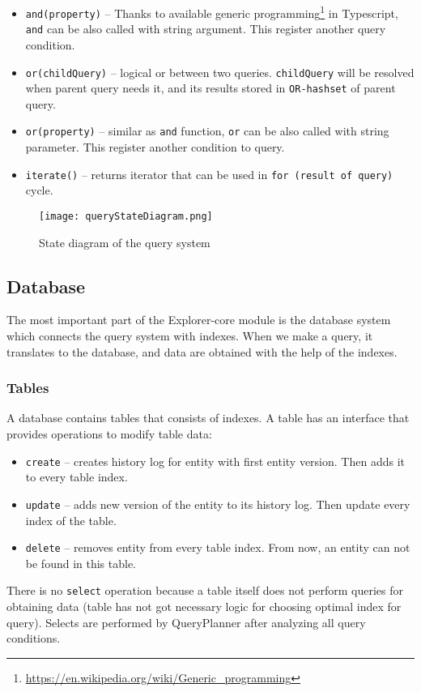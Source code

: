 \begin{itemize}
    \item \texttt{and(property)} -- Thanks to available generic programming\footnote{\url{https://en.wikipedia.org/wiki/Generic_programming}} in Typescript, \texttt{and} can be also called with string argument. This register another query condition.
    \item \texttt{or(childQuery)} -- logical or between two queries. \texttt{childQuery} will be resolved when parent query needs it, and its results stored in \texttt{OR-hashset} of parent query. 
    \item \texttt{or(property)} -- similar as \texttt{and} function, \texttt{or} can be also called with string parameter. This register another condition to query.
    \item \texttt{iterate()} -- returns iterator that can be used in \texttt{for (result of query)} cycle.
\end{itemize}


\begin{figure}[h]
    \centering
    \texttt{[image: queryStateDiagram.png]}
    \caption{State diagram of the query system}
    \label{queryStateDiagram}
\end{figure}


\subsection{Database}
The most important part of the Explorer-core module is the database system which connects the query system with indexes. When we make a query, it translates to the database, and data are obtained with the help of the indexes.

\subsubsection{Tables}
A database contains tables that consists of indexes. A table has an interface that provides operations to modify table data:
\begin{itemize}
    \item \texttt{create} -- creates history log for entity with first entity version. Then adds it to every table index.
    \item \texttt{update} -- adds new version of the entity to its history log. Then update every index of the table.
    \item \texttt{delete} -- removes entity from every table index. From now, an entity can not be found in this table.
\end{itemize}
There is no \texttt{select} operation because a table itself does not perform queries for obtaining data (table has not got necessary logic for choosing optimal index for query). Selects are performed by QueryPlanner after analyzing all query conditions.


